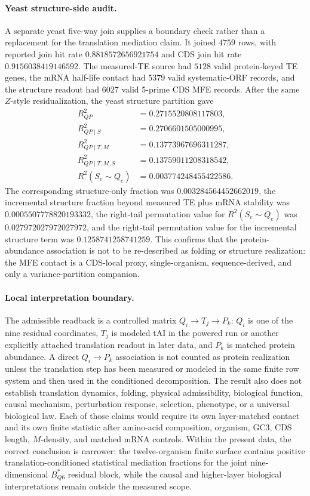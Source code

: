 \paragraph{Yeast structure-side audit.}
A separate yeast five-way join supplies a boundary check rather than a replacement for the translation mediation claim.  It joined $4759$ rows, with reported join hit rate $0.8818572656921754$ and CDS join hit rate $0.9156038419146592$.  The measured-TE source had $5128$ valid protein-keyed TE genes, the mRNA half-life contact had $5379$ valid systematic-ORF records, and the structure readout had $6027$ valid 5-prime CDS MFE records.  After the same $Z$-style residualization, the yeast structure partition gave
$$
\begin{aligned}
R^2_{QP} &= 0.2715520808117803,\\
R^2_{QP\mid S} &= 0.2706601505000995,\\
R^2_{QP\mid T,M} &= 0.13773967696311287,\\
R^2_{QP\mid T,M,S} &= 0.13759011208318542,\\
R^2(S_e\sim Q_e) &= 0.003774248455422586.
\end{aligned}
$$
The corresponding structure-only fraction was $0.003284564452662019$, the incremental structure fraction beyond measured TE plus mRNA stability was $0.0005507778820193332$, the right-tail permutation value for $R^2(S_e\sim Q_e)$ was $0.027972027972027972$, and the right-tail permutation value for the incremental structure term was $0.1258741258741259$.  This confirms that the protein-abundance association is not to be re-described as folding or structure realization: the MFE contact is a CDS-local proxy, single-organism, sequence-derived, and only a variance-partition companion.

\paragraph{Local interpretation boundary.}
The admissible readback is a controlled matrix $Q_i \to T_j \to P_k$: $Q_i$ is one of the nine residual coordinates, $T_j$ is modeled tAI in the powered run or another explicitly attached translation readout in later data, and $P_k$ is matched protein abundance.  A direct $Q_i\to P_k$ association is not counted as protein realization unless the translation step has been measured or modeled in the same finite row system and then used in the conditioned decomposition.  The result also does not establish translation dynamics, folding, physical admissibility, biological function, causal mechanism, perturbation response, selection, phenotype, or a universal biological law.  Each of those claims would require its own layer-matched contact and its own finite statistic after amino-acid composition, organism, GC3, CDS length, $M$-density, and matched mRNA controls.  Within the present data, the correct conclusion is narrower: the twelve-organism finite surface contains positive translation-conditioned statistical mediation fractions for the joint nine-dimensional $B^{\ast}_{Q6}$ residual block, while the causal and higher-layer biological interpretations remain outside the measured scope.
